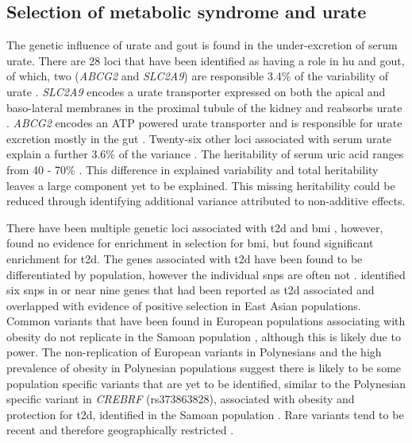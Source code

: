 \documentclass[]{report}
\begin{document}
\subsection{Selection of metabolic syndrome and urate}\label{goutMetSyn}

The genetic influence of urate and gout is found in the under-excretion
of serum urate. There are 28 loci that have been identified as having a
role in \gls{hu} and gout, of which, two (\emph{ABCG2} and
\emph{SLC2A9}) are responsible 3.4\% of the variability of urate
\citep{Kottgen2013}. \emph{SLC2A9} encodes a urate transporter expressed
on both the apical and baso-lateral membranes in the proximal tubule of
the kidney and reabsorbs urate \citep{Mandal2015}. \emph{ABCG2} encodes
an ATP powered urate transporter and is responsible for urate excretion
mostly in the gut \citep{Maliepaard2001, Mandal2015}. Twenty-six other
loci associated with serum urate explain a further 3.6\% of the variance
\citep{Kottgen2013}. The heritability of serum uric acid ranges from 40
- 70\% \citep{Nath2007, Yang2005}. This difference in explained
variability and total heritability leaves a large component yet to be
explained. This missing heritability could be reduced through
identifying additional variance attributed to non-additive effects.

There have been multiple genetic loci associated with \gls{t2d}
\citep{Billings2010} and \gls{bmi} \citep{Locke2015}, however,
\citet{Chen2010} found no evidence for enrichment in selection for
\gls{bmi}, but found significant enrichment for \gls{t2d}. The genes
associated with \gls{t2d} have been found to be differentiated by
population, however the individual \glspl{snp} are often not
\citep{pickrell2009signals}. \citet{Koh2014} identified six \glspl{snp}
in or near nine genes that had been reported as \gls{t2d} associated and
overlapped with evidence of positive selection in East Asian
populations. Common variants that have been found in European
populations associating with obesity do not replicate in the Samoan
population \citep{Karns2012}, although this is likely due to power. The
non-replication of European variants in Polynesians and the high
prevalence of obesity in Polynesian populations suggest there is likely
to be some population specific variants that are yet to be identified,
similar to the Polynesian specific variant in \emph{CREBRF}
(rs373863828), associated with obesity and protection for \gls{t2d},
identified in the Samoan population \citep{Minster2016}. Rare variants
tend to be recent and therefore geographically restricted
\citep{1KGP2012}.
\end{document}
